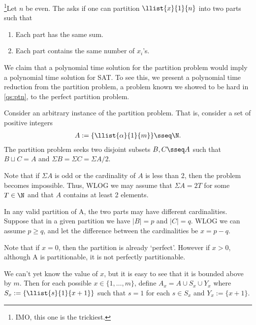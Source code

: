 \documentclass{article}
\begin{document}

\begin{subexercise}
  \footnote[3]{IMO, this one is the trickiest.}Let $n$ be even.
  The  asks if one can partition $ \llist{x}{1}{n} $ into two parts such that
  \begin{enumerate}[label=(\alph*)]
    \item Each part has the same sum.
    \item Each part contains the same number of $ x_i $'s.
  \end{enumerate}
\end{subexercise}
\begin{solution}
  We claim that a polynomial time solution for the partition problem would imply a polynomial time solution for SAT.
  To see this, we present a polynomial time reduction from the partition problem, a problem known we showed to be hard in \ref{qs:ptn}, to the perfect partition problem.

  Consider an arbitrary instance of the partition problem.
  That is, consider a set of positive integers \begin{align*}
    A := \{\llist{\alpha}{1}{m}\} \sseq \N.
  \end{align*}
  The partition problem seeks two disjoint subsets $ B,C\sseq A $ such that $ B\sqcup C = A $ and $ \Sigma B = \Sigma C = \Sigma A / 2$.

  Note that if $ \Sigma A $ is odd or the cardinality of $ A $ is less than 2, then the problem becomes impossible.
  Thus, WLOG we may assume that $ \Sigma A = 2T $ for some $ T\in \N $ and that $ A $ contains at least 2 elements.

  In any valid partition of A, the two parts may have different cardinalities.
  Suppose that in a given partition we have $ |B| = p $ and $ |C| = q $.
  WLOG we can assume $ p \geq q $, and let the difference between the cardinalities be $ x = p-q $.

  Note that if $ x = 0 $, then the partition is already `perfect'.
  However if $ x > 0 $, although A is partitionable, it is not perfectly partitionable.

  We can't yet know the value of $ x $, but it is easy to see that it is bounded above by $ m $.
  Then for each possible $ x\in \{1,\ldots,m\}$, define $ A_x = A \cup S_x \cup Y_x $ where $ S_x := \{\llist{s}{1}{x+1} \} $ such that $ s = 1 $ for each $ s\in S_x $ and $ Y_x := \{x+1\} $.


\end{solution}
\end{document}
